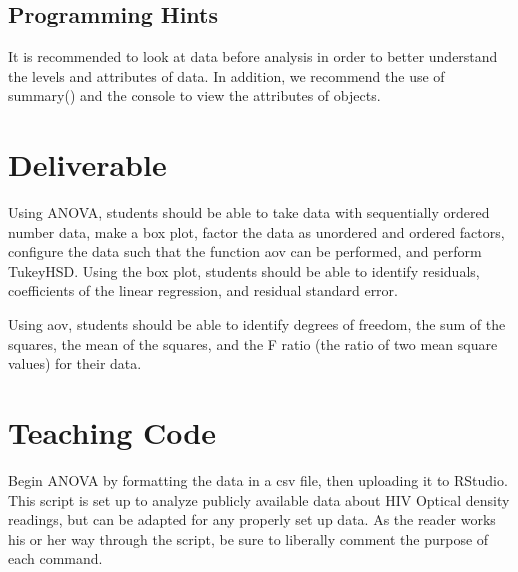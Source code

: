 \documentclass[11pt]{article}
\begin{document}
 \subsection{Programming Hints}
It is recommended to look at data before analysis in order to better understand the levels and attributes of data.
In addition, we recommend the use of summary() and the console to view the attributes of objects.
 

\section{Deliverable}

Using ANOVA, students should be able to take data with sequentially ordered number data, make a box plot, factor the data as unordered and ordered factors, configure the data such that the function aov can be performed, and perform TukeyHSD. Using the box plot, students should be able to identify residuals, coefficients of the linear regression, and residual standard error. 

Using aov, students should be able to identify degrees of freedom, the sum of the squares, the mean of the squares, and the F ratio (the ratio of two mean square values) for their data. 



\section{Teaching Code}

Begin ANOVA by formatting the data in a csv file, then uploading it to RStudio. This script is set up to analyze publicly available data about HIV Optical density readings, but can be adapted for any properly set up data. As the reader works his or her way through the script, be sure to liberally comment the purpose of each command. 
\end{document}
